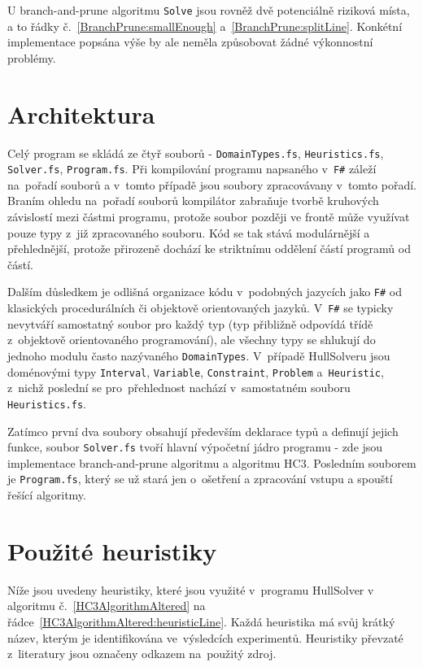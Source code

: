 U branch-and-prune algoritmu \verb|Solve| jsou rovněž dvě potenciálně riziková místa, a to řádky č.~\ref{BranchPrune:smallEnough} a~\ref{BranchPrune:splitLine}. Konkétní implementace popsána výše by ale neměla způsobovat žádné výkonnostní problémy.


\section{Architektura}
Celý program se skládá ze čtyř souborů - \verb|DomainTypes.fs|, \verb|Heuristics.fs|, \verb|Solver.fs|, \verb|Program.fs|. Při kompilování programu napsaného v~\texttt{F\#} záleží na~pořadí souborů a v~tomto případě jsou soubory zpracovávany v~tomto pořadí. Braním ohledu na~pořadí souborů kompilátor zabraňuje tvorbě kruhových závislostí mezi částmi programu, protože soubor později ve frontě může využívat pouze typy z~již zpracovaného souboru. Kód se tak stává modulárnější a přehlednější, protože přirozeně dochází ke striktnímu oddělení  částí programů od  částí.

Dalším důsledkem je odlišná organizace kódu v~podobných jazycích jako \texttt{F\#} od klasických procedurálních či objektově orientovaných jazyků. V~\texttt{F\#} se typicky nevytváří samostatný soubor pro každý typ (typ přibližně odpovídá třídě z~objektově orientovaného programování), ale všechny typy se shlukují do jednoho modulu často nazývaného \verb|DomainTypes|. V~případě HullSolveru jsou doménovými typy \verb|Interval|, \verb|Variable|, \verb|Constraint|, \verb|Problem| a~\verb|Heuristic|, z~nichž poslední se pro~přehlednost nachází v~samostatném souboru \verb|Heuristics.fs|.

Zatímco první dva soubory obsahují především deklarace typů a definují jejich funkce, soubor \verb|Solver.fs| tvoří hlavní výpočetní jádro programu - zde jsou implementace branch-and-prune algoritmu a algoritmu HC3. Posledním souborem je \verb|Program.fs|, který se už stará jen o~ošetření a zpracování vstupu a spouští řešící algoritmy.

\section{Použité heuristiky}
\label{ch:usedHeuristics}
Níže jsou uvedeny heuristiky, které jsou využité v~programu HullSolver v algoritmu č.~\ref{HC3AlgorithmAltered} na řádce~\ref{HC3AlgorithmAltered:heuristicLine}. Každá heuristika má svůj krátký název, kterým je identifikována ve~výsledcích experimentů. Heuristiky převzaté z~literatury jsou označeny odkazem na~použitý zdroj.


